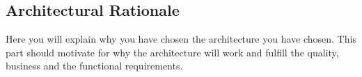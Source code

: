 \subsection{Architectural Rationale}

Here you will explain why you have chosen the architecture you have chosen. This part should motivate for why the architecture will work and fulfill the quality, business and the functional requirements.	
